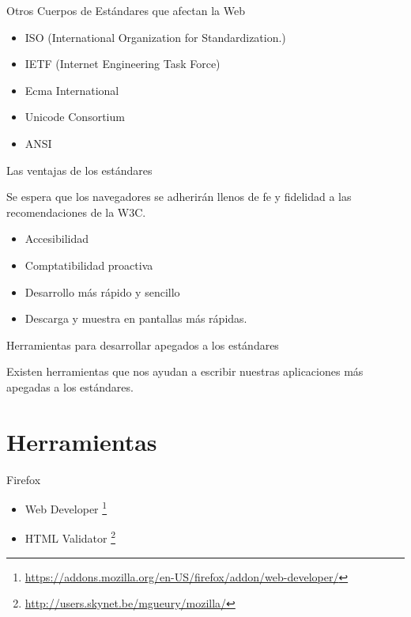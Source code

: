 \documentclass{beamer}
\begin{document}
\begin{frame}{Otros Cuerpos de Estándares que afectan la Web} %
    \begin{itemize}
        \item ISO (International Organization for Standardization.)
        \item IETF (Internet Engineering Task Force) 
        \item Ecma International
        \item Unicode Consortium
        \item ANSI
    \end{itemize}
\end{frame}

\begin{frame}{Las ventajas de los estándares} %
    \begin{center}
    Se espera que los navegadores se adherirán llenos de fe y fidelidad a las
    recomendaciones de la W3C. 
    \end{center}
    \begin{itemize}
        \item Accesibilidad
        \item Comptatibilidad proactiva
        \item Desarrollo más rápido y sencillo 
        \item Descarga y muestra en pantallas más rápidas. 
    \end{itemize}
\end{frame}

\begin{frame}{Herramientas para desarrollar apegados a los estándares} %
    \begin{center}
    Existen herramientas que nos ayudan a escribir nuestras aplicaciones más
    apegadas a los estándares.
    \end{center}
\end{frame}

\section{Herramientas}

\begin{frame}{Firefox} %
    \begin{center}
    \begin{itemize}
        \item Web Developer \footnote{\url{https://addons.mozilla.org/en-US/firefox/addon/web-developer/}}
        \item HTML Validator \footnote{\url{http://users.skynet.be/mgueury/mozilla/}}
    \end{itemize}
    \end{center}
\end{frame}
\end{document}
